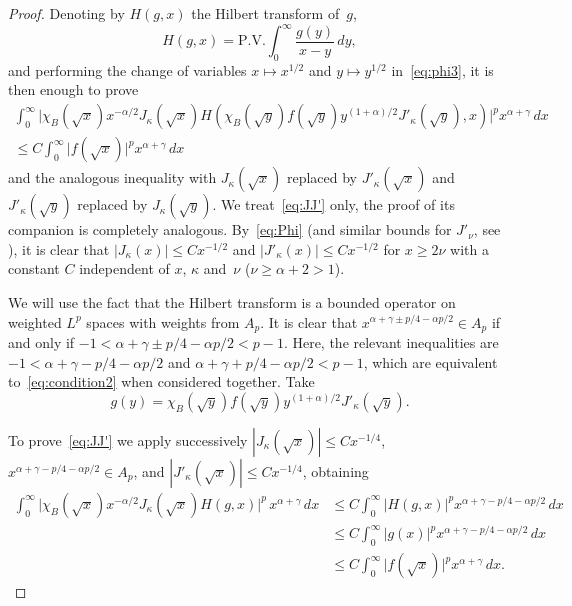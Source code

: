 \documentclass[a4paper]{amsart}
\begin{document}
\begin{proof}
Denoting by $H(g,x)$ the Hilbert transform of~$g$,
\begin{equation*}
  H(g,x) = \text{P.V.} \int_0^\infty \frac {g(y)}{x-y}\,dy,
\end{equation*}
and performing the change of variables
$x \mapsto x^{1/2}$ and $y \mapsto y^{1/2}$ in~\eqref{eq:phi3},
it is then enough to prove
\begin{multline}
\label{eq:JJ'}
  \int_0^\infty \big| \chi_B(\sqrt{x}) x^{-\alpha/2} J_\kappa(\sqrt{x})
    H(\chi_B(\sqrt{y}) f(\sqrt{y}) y^{(1+\alpha)/2} J'_\kappa(\sqrt{y}), x)
    \big|^p x^{\alpha+\gamma}\,dx \\
  \le C \int_0^\infty\big| f(\sqrt{x})\big|^p x^{\alpha+\gamma}\,dx
\end{multline}
and the analogous inequality with $J_\kappa(\sqrt{x})$ replaced by
$J'_\kappa(\sqrt{x})$ and $J'_\kappa(\sqrt{y})$ replaced by $J_\kappa(\sqrt{y})$.
We treat~\eqref{eq:JJ'} only, the proof of its companion is completely analogous.
By~\eqref{eq:Phi} (and similar bounds for $J'_\nu$, see \cite{CiStV}), it
is clear that $|J_\kappa(x)| \le Cx^{-1/2}$ and
$|J'_\kappa(x)| \le Cx^{-1/2}$ for $x \ge 2\nu$
with a constant $C$ independent of $x$, $\kappa$ and~$\nu$ ($\nu\ge\alpha+2>1$).

We will use the fact that the Hilbert
transform is a bounded operator on weighted $L^p$ spaces with weights from
$A_p$. It is clear that $x^{\alpha+\gamma \pm p/4 - \alpha p/2} \in A_p$
if and only if $-1 < \alpha+\gamma \pm p/4 - \alpha p/2 < p-1$.
Here, the relevant inequalities are $-1 < \alpha+\gamma - p/4 - \alpha p/2$
and $ \alpha+\gamma + p/4 - \alpha p/2 < p-1$,
which are equivalent to~\eqref{eq:condition2} when  considered together.
Take
\begin{equation*}
  g(y) = \chi_B(\sqrt{y}) f(\sqrt{y}) y^{(1+\alpha)/2} J'_\kappa(\sqrt{y}).
\end{equation*}

To prove~\eqref{eq:JJ'} we apply successively
$|J_\kappa(\sqrt{x})| \le Cx^{-1/4}$, $x^{\alpha+\gamma-p/4-\alpha
p/2} \in A_p$, and $|J'_\kappa(\sqrt{x})| \le Cx^{-1/4}$,
obtaining
\begin{align*}
  \int_0^\infty \big| \chi_B(\sqrt{x}) x^{-\alpha/2} J_\kappa(\sqrt{x})
    H(g, x) \big|^p\,x^{\alpha+\gamma}\,dx
  &\le C \int_0^\infty  |H(g, x)|^p x^{\alpha+\gamma-p/4-\alpha p/2}\,dx\\
  &\le C \int_0^\infty  |g(x)|^p x^{\alpha+\gamma-p/4-\alpha p/2}\,dx \\
  &\le  C \int_0^\infty \big|f(\sqrt{x})\big|^p x^{\alpha+\gamma}\,dx.
\end{align*}
\end{proof}
\end{document}
